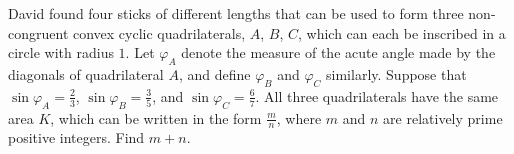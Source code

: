 David found four sticks of different lengths that can be used to form three non-congruent convex cyclic quadrilaterals, \(A\), \(B\), \(C\), which can each be inscribed in a circle with radius \(1\). Let \(\varphi_A\) denote the measure of the acute angle made by the diagonals of quadrilateral \(A\), and define \(\varphi_B\) and \(\varphi_C\) similarly. Suppose that \(\sin\varphi_A=\frac{2}{3}\), \(\sin\varphi_B=\frac{3}{5}\), and \(\sin\varphi_C=\frac{6}{7}\). All three quadrilaterals have the same area \(K\), which can be written in the form \(\frac{m}{n}\), where \(m\) and \(n\) are relatively prime positive integers. Find \(m+n\).